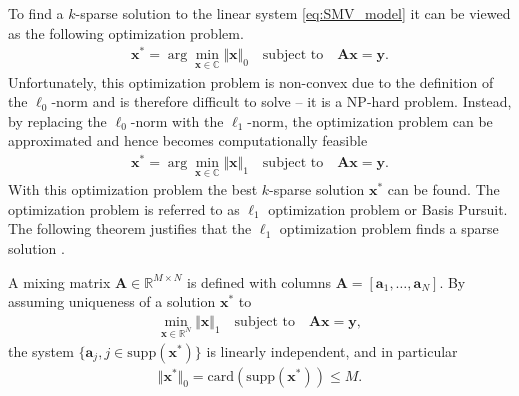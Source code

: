 To find a $k$-sparse solution to the linear system \eqref{eq:SMV_model} it can be viewed as the following optimization problem. 
\begin{align*}\label{eq:SMV_p0}
\mathbf{x}^\ast = \arg \min_{\mathbf{x} \in \mathbb{C}} \Vert \mathbf{x} \Vert_0 \quad \text{subject to} \quad \mathbf{Ax} = \mathbf{y}.
\end{align*}
Unfortunately, this optimization problem is non-convex due to the definition of the $\ell_0$-norm and is therefore difficult to solve -- it is a NP-hard problem. 
Instead, by replacing the $\ell_0$-norm with the $\ell_1$-norm, the optimization problem can be approximated and hence becomes computationally feasible \cite[p. 27]{CS}
\begin{align}\label{eq:SMV_p1}
\mathbf{x}^\ast = \arg \min_{\mathbf{x} \in \mathbb{C}} \Vert \mathbf{x} \Vert_1 \quad \text{subject to} \quad \mathbf{Ax} = \mathbf{y}.
\end{align} 
With this optimization problem the best $k$-sparse solution $\mathbf{x}^\ast$ can be found. 
The optimization problem is referred to as $\ell_1$ optimization problem or Basis Pursuit. 
The following theorem justifies that the $\ell_1$ optimization problem finds a sparse solution \cite[p. 62-63]{FR}.
\begin{theorem}\label{th:CS_A}
A mixing matrix $\mathbf{A} \in \mathbb{R}^{M \times N}$ is defined with columns $\mathbf{A} = [\mathbf{a}_1, \dots, \mathbf{a}_N]$. 
By assuming uniqueness of a solution $\mathbf{x}^{\ast}$ to
\begin{align*}
\min_{\mathbf{x} \in \mathbb{R}^N} \Vert \mathbf{x} \Vert_1 \quad \text{subject to} \quad \mathbf{Ax} = \mathbf{y},
\end{align*}
the system $\lbrace \mathbf{a}_j, j \in \text{supp}( \mathbf{x}^\ast) \rbrace$ is linearly independent, and in particular
\begin{align*}
\Vert \mathbf{x}^\ast \Vert_0 = \text{card}(\text{supp} (\mathbf{x}^\ast)) \leq M.
\end{align*}
\end{theorem}
